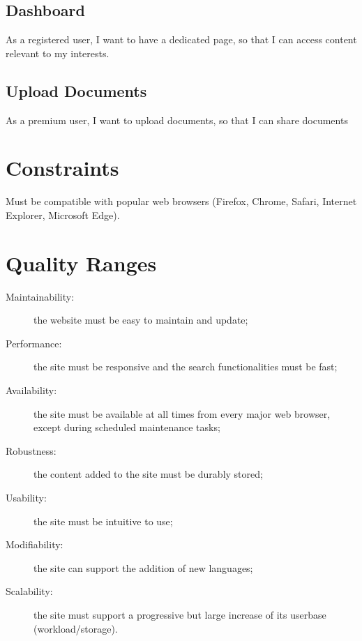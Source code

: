 \documentclass [a4paper, 11pt]{article}
\begin{document}
\subsection{Dashboard}
As a registered user, I want to have a dedicated page, so that I can access content relevant to my interests.

\subsection{Upload Documents}
As a premium user, I want to upload documents, so that I can share documents



\section{Constraints}
Must be compatible with popular web browsers (Firefox, Chrome, Safari, Internet Explorer, Microsoft Edge).



\section{Quality Ranges}
\begin{description}
	\item [Maintainability:] the website must be easy to maintain and update;
	\item [Performance:] the site must be responsive and the search functionalities must be fast;
	\item [Availability:] the site must be available at all times from every major web browser, except during scheduled maintenance tasks;
	\item [Robustness:] the content added to the site must be durably stored;
	\item [Usability:] the site must be intuitive to use;
	\item [Modifiability:] the site can support the addition of new languages;
	\item [Scalability:] the site must support a progressive but large increase of its userbase (workload/storage).
\end{description}
\end{document}
